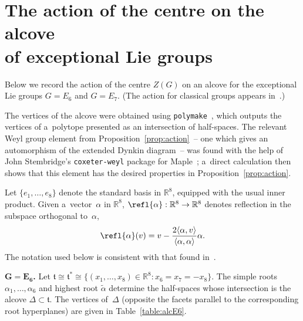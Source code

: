 \documentclass[pdftex]{sigma}
\numberwithin{equation}{section}
\begin{document}
\appendix

\section{The action of the centre on the alcove\\
of exceptional Lie groups}\label{app}

Below we record the action of the centre $Z(G)$ on an alcove for the exceptional Lie groups $G=E_6$ and $G=E_7$.
(The action for classical groups appears in~\cite{TL}.)

The vertices of the alcove were obtained using \texttt{polymake}~\cite{polymake}, which outputs the vertices of
a~polytope presented as an intersection of half-spaces.
The relevant Weyl group element from Proposition~\ref{prop:action}~-- one which gives an automorphism of the extended
Dynkin diagram~-- was found with the help of John Stembridge's \texttt{coxeter-weyl} package for Maple~\cite{St};
a~direct calculation then shows that this element has the desired properties in Proposition~\ref{prop:action}.

Let $\{e_1, \ldots, e_8 \}$ denote the standard basis in ${\mathbb{R}}^8$, equipped with the usual inner product.
Given a~vector~$\alpha$ in ${\mathbb{R}}^8$, $\refl{\alpha}:{\mathbb{R}}^8\to {\mathbb{R}}^8$ denotes ref\/lection in the
subspace orthogonal to~$\alpha$,
\begin{gather*}
\refl{\alpha}(v)=v-\frac{2\langle \alpha,v \rangle}{\langle \alpha,\alpha \rangle} \alpha.
\end{gather*}
The notation used below is consistent with that found in~\cite[Planches V-VI]{Bourbaki}.

{\bf $\boldsymbol{G=E_6}$.}
Let $\mathfrak{t} \cong \mathfrak{t}^*\cong \{(x_1, \ldots, x_8) \in {\mathbb{R}}^8 \colon x_6=x_7=-x_8 \}$.
The simple roots $\alpha_1, \ldots, \alpha_6$ and highest root $\tilde\alpha$ determine the half-spaces whose
intersection is the alcove $\Delta \subset \mathfrak{t}$.
The vertices of~$\Delta$ (opposite the facets parallel to the corresponding root hyperplanes) are given in
Table~\ref{table:alcE6}.
\end{document}
